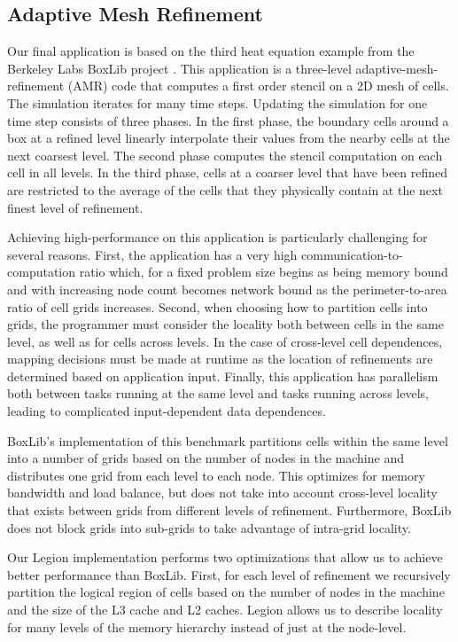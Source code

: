 \subsection{Adaptive Mesh Refinement}
\label{subsec:exp_amr}
Our final application is based on the third heat equation example from the Berkeley Labs 
BoxLib project \cite{BoxLib}.  This application is a three-level adaptive-mesh-refinement (AMR)
code that computes a first order stencil on a 2D mesh of cells.  The simulation iterates for many time
steps.  Updating the simulation for one time step consists of three phases.  In the first phase,
the boundary cells around a box at a refined level linearly interpolate their values from the nearby cells at the
next coarsest level.  The second phase computes the stencil computation on each cell in all levels.
In the third phase, cells at a coarser level that have been refined are restricted to the average
of the cells that they physically contain at the next finest level of refinement.

Achieving high-performance on this application is particularly challenging for several reasons.  
First, the application has a very high communication-to-computation ratio which, for a fixed problem
size begins as being memory bound and with increasing node count becomes network bound as the
perimeter-to-area ratio of cell grids increases.  Second, when choosing how to partition cells into grids, the
programmer must consider the locality both between cells in the same level, as well as for cells
across levels.  In the case of cross-level cell dependences, mapping decisions must be made at runtime as the
location of refinements are determined based on application input.  Finally, this application has
parallelism both between tasks running at the same level and tasks running across levels, leading
to complicated input-dependent data dependences.

BoxLib's implementation of this benchmark partitions cells within the same level into a number of grids
based on the number of nodes in the machine and distributes one grid from each level to each node.  This
optimizes for memory bandwidth and load balance, but does not take into account cross-level locality 
that exists between grids from different levels of refinement.  Furthermore, BoxLib does not block grids
into sub-grids to take advantage of intra-grid locality.

Our Legion implementation performs two optimizations that allow us to achieve better performance than BoxLib.
First, for each level of refinement we recursively partition the logical region of cells based on 
the number of nodes in the machine and the size of the L3 cache and L2 caches.  Legion allows us to describe 
locality for many levels of the memory hierarchy instead of just at the node-level.

